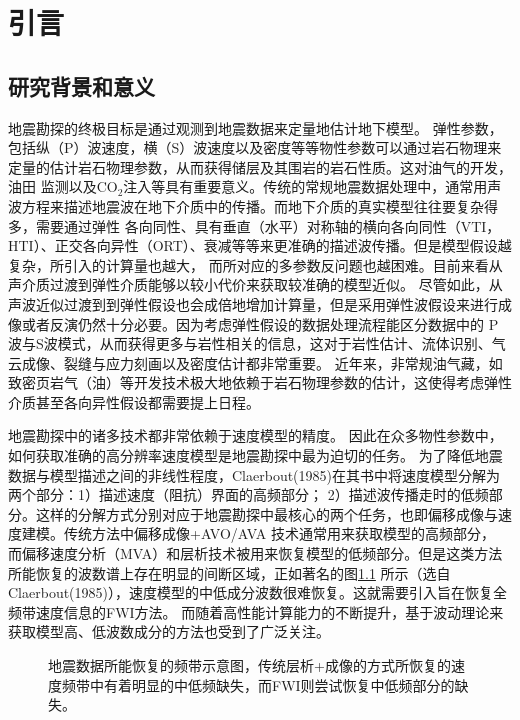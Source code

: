 \chapter{引言}
\section{研究背景和意义}
地震勘探的终极目标是通过观测到地震数据来定量地估计地下模型。
弹性参数，包括纵（P）波速度，横（S）波速度以及密度等等物性参数可以通过岩石物理来定量的估计岩石物理参数，从而获得储层及其围岩的岩石性质。这对油气的开发，油田
监测以及CO$_2$注入等具有重要意义。传统的常规地震数据处理中，通常用声波方程来描述地震波在地下介质中的传播。而地下介质的真实模型往往要复杂得多，需要通过弹性
各向同性、具有垂直（水平）对称轴的横向各向同性（VTI，HTI）、正交各向异性（ORT）、衰减等等来更准确的描述波传播。但是模型假设越复杂，所引入的计算量也越大，
而所对应的多参数反问题也越困难。目前来看从声介质过渡到弹性介质能够以较小代价来获取较准确的模型近似。
尽管如此，从声波近似过渡到到弹性假设也会成倍地增加计算量，但是采用弹性波假设来进行成像或者反演仍然十分必要。因为考虑弹性假设的数据处理流程能区分数据中的
P波与S波模式，从而获得更多与岩性相关的信息，这对于岩性估计、流体识别、气云成像、裂缝与应力刻画以及密度估计都非常重要。
近年来，非常规油气藏，如致密页岩气（油）等开发技术极大地依赖于岩石物理参数的估计，这使得考虑弹性介质甚至各向异性假设都需要提上日程。

地震勘探中的诸多技术都非常依赖于速度模型的精度。
因此在众多物性参数中，如何获取准确的高分辨率速度模型是地震勘探中最为迫切的任务。
为了降低地震数据与模型描述之间的非线性程度，Claerbout(1985)\cite{Claerbout1985Imaging}在其书中将速度模型分解为两个部分：1）描述速度（阻抗）界面的高频部分；
2）描述波传播走时的低频部分。这样的分解方式分别对应于地震勘探中最核心的两个任务，也即偏移成像与速度建模。传统方法中偏移成像+AVO/AVA
技术通常用来获取模型的高频部分，
而偏移速度分析（MVA）和层析技术被用来恢复模型的低频部分。但是这类方法所能恢复的波数谱上存在明显的间断区域，正如著名的图\ref{fig:GapInSeisVel}
所示（选自Claerbout(1985)\cite{Claerbout1985Imaging}），速度模型的中低成分波数很难恢复。这就需要引入旨在恢复全频带速度信息的FWI方法。
而随着高性能计算能力的不断提升，基于波动理论来获取模型高、低波数成分的方法也受到了广泛关注。
\begin{figure}[!htb] 
   \centering 
   \caption{地震数据所能恢复的频带示意图，传统层析+成像的方式所恢复的速度频带中有着明显的中低频缺失，而FWI则尝试恢复中低频部分的缺失。}
   \label{fig:GapInSeisVel}
\end{figure}

